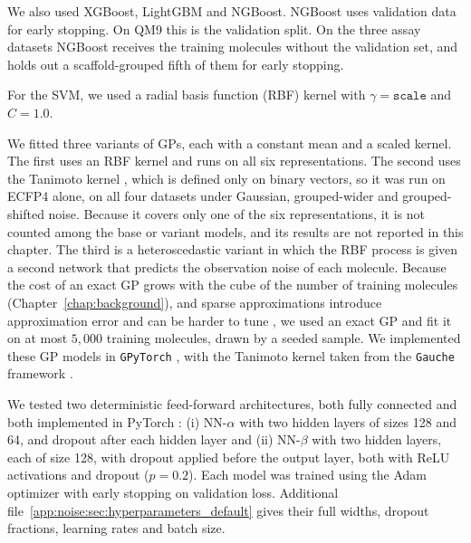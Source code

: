We also used XGBoost, LightGBM and NGBoost. NGBoost uses validation data for early stopping. On QM9 this is the validation split. On the three assay datasets NGBoost receives the training molecules without the validation set, and holds out a scaffold-grouped fifth of them for early stopping.

For the SVM, we used a radial basis function (RBF) kernel with $\gamma = \texttt{scale}$ and $C = 1.0$.

We fitted three variants of GPs, each with a constant mean and a scaled kernel. The first uses an RBF kernel and runs on all six representations. The second uses the Tanimoto kernel \citep{Ralaivola2005, moss2020}, which is defined only on binary vectors, so it was run on ECFP4 alone, on all four datasets under Gaussian, grouped-wider and grouped-shifted noise. Because it covers only one of the six representations, it is not counted among the base or variant models, and its results are not reported in this chapter. The third is a heteroscedastic variant in which the RBF process is given a second network that predicts the observation noise of each molecule. Because the cost of an exact GP grows with the cube of the number of training molecules (Chapter~\ref{chap:background}), and sparse approximations introduce approximation error and can be harder to tune \citep{quinonero2005}, we used an exact GP and fit it on at most $5{,}000$ training molecules, drawn by a seeded sample. We implemented these GP models in \texttt{GPyTorch} \citep{gpytorch}, with the Tanimoto kernel taken from the \texttt{Gauche} framework \citep{gauche}.

We tested two deterministic feed-forward architectures, both fully connected and both implemented in PyTorch \citep{Paszke2019}: (i) NN-$\alpha$ with two hidden layers of sizes 128 and 64, and dropout after each hidden layer and (ii) NN-$\beta$ with two hidden layers, each of size 128, with dropout applied before the output layer, both with ReLU activations and dropout ($p = 0.2$). Each model was trained using the Adam optimizer with early stopping on validation loss. Additional file~\ref{app:noise:sec:hyperparameters_default} gives their full widths, dropout fractions, learning rates and batch size.

